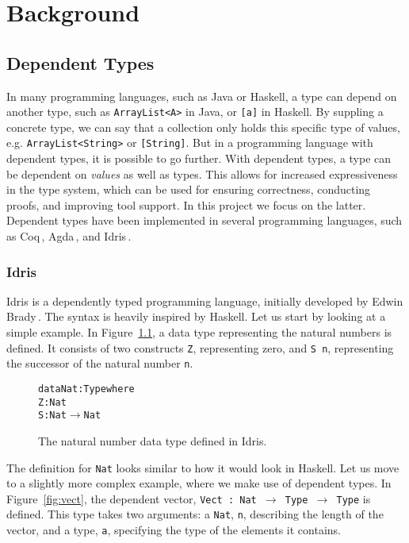 \chapter{Background}
\label{chap:Background}
\section{Dependent Types}
\label{sec:DependentTypes}
In many programming languages, such as Java or Haskell, a type can depend on another type, such as \texttt{ArrayList<A>} in Java, or \texttt{[a]} in Haskell. By suppling a concrete type, we can say that a collection only holds this specific type of values, e.g. \texttt{ArrayList<String>} or \texttt{[String]}. But in a programming language with dependent types, it is possible to go further. With dependent types, a type can be dependent on \emph{values} as well as types. This allows for increased expressiveness in the type system, which can be used for ensuring correctness, conducting proofs, and improving tool support. In this project we focus on the latter. Dependent types have been implemented in several programming languages, such as Coq\,\cite{Coq}, Agda\,\cite{Agda}, and
Idris\,\cite{Idris}.

\subsection{Idris}
\label{subsec:Idris}
Idris is a dependently typed programming language, initially developed by Edwin Brady\,\cite{Idris}. The syntax is heavily inspired by Haskell. Let us start by looking at a simple example. In Figure~\ref{fig:nat}, a data type representing the natural numbers is defined. It consists of two constructs \texttt{Z}, representing zero, and \texttt{S~n}, representing the successor of the natural number \texttt{n}.

\begin{figure}
\begin{alltt}
data Nat : Type where
  Z : Nat
  S : Nat \(\to\) Nat
\end{alltt}
\caption{The natural number data type defined in Idris.}
\label{fig:nat}
\end{figure}

The definition for \texttt{Nat} looks similar to how it would look in Haskell. Let us move to a slightly more complex example, where we make use of dependent types. In Figure~\ref{fig:vect}, the dependent vector, \texttt{Vect : Nat $\to$ Type $\to$ Type} is defined. This type takes two arguments: a \texttt{Nat}, \texttt{n}, describing the length of the vector, and a type, \texttt{a}, specifying the type of the elements it contains.

